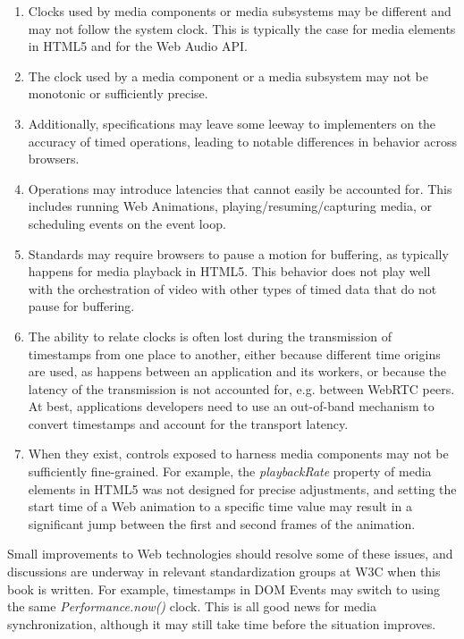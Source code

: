 \documentclass[graybox]{svmult}
\begin{document}
\begin{enumerate}

\item{
Clocks used by media components or media subsystems may be different and may
not follow the system clock. This is typically the case for media elements in
HTML5 and for the Web Audio API.
}

\item{
The clock used by a media component or a media subsystem may not be monotonic
or sufficiently precise.
}

\item{
Additionally, specifications may leave some leeway to implementers on the
accuracy of timed operations, leading to notable differences in behavior
across browsers.
}

\item{
Operations may introduce latencies that cannot easily be accounted for. This
includes running Web Animations, playing/resuming/capturing media, or
scheduling events on the event loop.
}

\item{
Standards may require browsers to pause a motion for buffering, as typically
happens for media playback in HTML5. This behavior does not play well with the
orchestration of video with other types of timed data that do not pause for
buffering.
}

\item{ The ability to relate clocks is often lost during the transmission of
timestamps from one place to another, either because different time origins
are used, as happens between an application and its workers, or because the
latency of the transmission is not accounted for, e.g. between WebRTC peers.
At best, applications developers need to use an out-of-band mechanism to
convert timestamps and account for the transport latency. }

\item{
When they exist, controls exposed to harness media components may not be
sufficiently fine-grained. For example, the \emph{playbackRate} property of media
elements in HTML5 was not designed for precise adjustments, and setting the
start time of a Web animation to a specific time value may result in a
significant jump between the first and second frames of the animation.
}

\end{enumerate}

Small improvements to Web technologies should resolve some of these issues,
and discussions are underway in relevant standardization groups at W3C when
this book is written. For example, timestamps in DOM Events may
switch to using the same \emph{Performance.now()} clock. This is all good news for
media synchronization, although it may still take time before the situation
improves.
\end{document}
